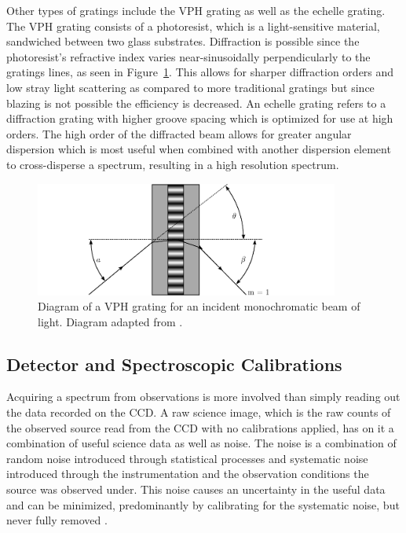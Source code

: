 Other types of gratings include the \gls{VPH} grating as well as the echelle grating. The \gls{VPH} grating consists of a photoresist, which is a light-sensitive material, sandwiched between two glass substrates. Diffraction is possible since the photoresist's refractive index varies near-sinusoidally perpendicularly to the gratings lines, as seen in Figure~\ref{fig:vph_grating}. This allows for sharper diffraction orders and low stray light scattering as compared to more traditional gratings but since blazing is not possible the efficiency is decreased. An echelle grating refers to a diffraction grating with higher groove spacing which is optimized for use at high orders. The high order of the diffracted beam allows for greater angular dispersion which is most useful when combined with another dispersion element to cross-disperse a spectrum, resulting in a high resolution spectrum.

\begin{figure}[t]
    \centering
    \includegraphics[width = 10cm]{figures/2_vph_grating.pdf}
    \caption{Diagram of a \gls{VPH} grating for an incident monochromatic beam of light. Diagram adapted from \cite{BirneyObsAstro}.}
    \label{fig:vph_grating}
\end{figure}

\subsection{Detector and Spectroscopic Calibrations}\label{subsec:calibration}

Acquiring a spectrum from observations is more involved than simply reading out the data recorded on the \gls{CCD}. A raw science image, which is the raw counts of the observed source read from the \gls{CCD} with no calibrations applied, has on it a combination of useful science data as well as noise. The noise is a combination of random noise introduced through statistical processes and systematic noise introduced through the instrumentation and the observation conditions the source was observed under. This noise causes an uncertainty in the useful data and can be minimized, predominantly by calibrating for the systematic noise, but never fully removed \citep{CCDhandbook}.

